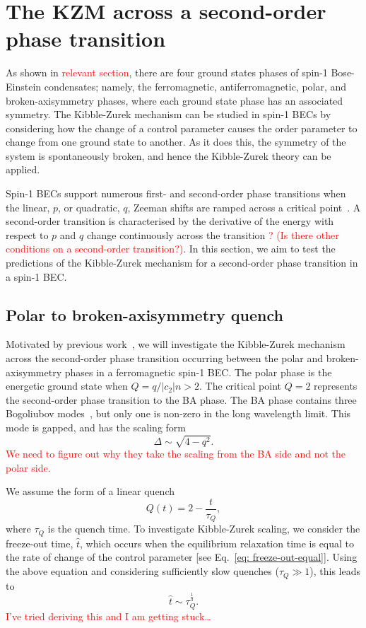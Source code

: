 \section{The KZM across a second-order phase transition}
As shown in \textcolor{red}{relevant section}, there are four ground states
phases of spin-1 Bose-Einstein condensates; namely, the ferromagnetic,
antiferromagnetic, polar, and broken-axisymmetry phases, where each ground
state phase has an associated symmetry.
The Kibble-Zurek mechanism can be studied in spin-1 BECs by considering how
the change of a control parameter causes the order parameter to change from 
one ground state to another.
As it does this, the symmetry of the system is spontaneously broken, and hence
the Kibble-Zurek theory can be applied.

Spin-1 BECs support numerous first- and second-order phase transitions
when the linear, \( p \), or quadratic, \( q \), Zeeman shifts are
ramped across a critical point~\cite{Kawaguchi2012}.
A second-order transition is characterised by the derivative of the energy with
respect to \( p \) and \( q \) change continuously across the transition
\textcolor{red}{? (Is there other conditions on a second-order transition?)}.
In this section, we aim to test the predictions of the Kibble-Zurek mechanism
for a second-order phase transition in a spin-1 BEC\@.

\subsection{Polar to broken-axisymmetry quench}
Motivated by previous work~\cite{Damski2007}, we will investigate the
Kibble-Zurek mechanism across the second-order phase transition occurring
between the polar and broken-axisymmetry phases in a ferromagnetic spin-1 BEC\@.
The polar phase is the energetic ground state when \( Q=q/|c_2|n > 2 \).
The critical point \( Q = 2 \) represents the second-order phase transition to
the BA phase.
The BA phase contains three Bogoliubov modes~\cite{Uchino2010}, but only one
is non-zero in the long wavelength limit.
This mode is gapped, and has the scaling form
\begin{equation}
    \Delta \sim \sqrt{4 - q^2}.
\end{equation}
\textcolor{red}{We need to figure out why they take the scaling from the BA side
and not the polar side.}

We assume the form of a linear quench
\begin{equation}
    Q(t) = 2 - \frac{t}{\tau_Q},
    \label{eq: time-dep-Q-damski}
\end{equation}
where \( \tau_Q \) is the quench time.
To investigate Kibble-Zurek scaling, we consider the freeze-out time, \( \hat{t} \),
which occurs when the equilibrium relaxation time is equal to the rate of change
of the control parameter [see Eq.~\eqref{eq: freeze-out-equal}].
Using the above equation and considering sufficiently slow quenches
(\(\tau_Q \gg 1\)), this leads to
\begin{equation}
    \hat{t} \sim \tau_Q^{\frac{1}{3}}.
\end{equation}
\textcolor{red}{I've tried deriving this and I am getting stuck\ldots}

